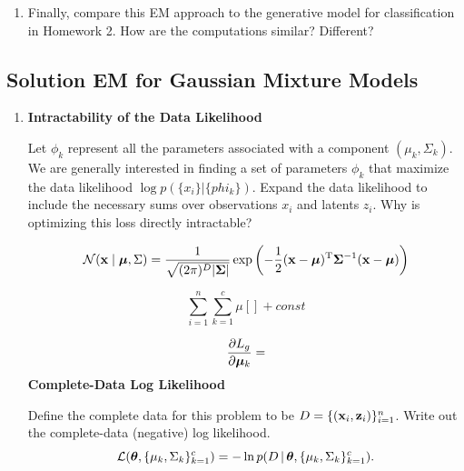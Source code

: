 \documentclass[submit]{harvardml}
\newenvironment{answer}{%
    \color{answergreen}\bf}
\newcommand{\bx}{\mathbf{x}} %
\begin{document}
\begin{problem}
\begin{enumerate}
\item Finally, compare this EM approach to the generative model for
classification in Homework 2.  How are the computations similar?
Different? 

\end{enumerate}


  
\end{problem}

\subsection*{Solution EM for Gaussian Mixture Models}


\begin{enumerate}

    \item \textbf{Intractability of the Data Likelihood} 
        
        Let $\phi_k$ represent all the parameters associated with a component $(\mu_k,\Sigma_k)$.
        We are generally interested in finding a set of parameters $\phi_k$ that maximize the data
        likelihood $\log p(\{x_i\}|\{phi_k\})$.  Expand the data likelihood to include the necessary
		sums over observations $x_i$ and latents $z_i$.  Why is optimizing this
		loss directly intractable?

		\begin{answer}

    \begin{equation}
     \mathcal{N}(\bx \mid \bmu, \Sigma)
             = \frac{1}{\sqrt{(2\pi)^D|\bSigma|}}  \exp\left(-\frac 1 2 ({\mathbf x}-{\boldsymbol\mu})^\mathrm{T}{\boldsymbol\Sigma}^{-1}({\mathbf x}-{\boldsymbol\mu})\right)
    \end{equation}

        \begin{equation}
            \sum_{i=1}^n \sum_{k=1}^c \mu
            \left[ 
            \right] + const
        \end{equation}

        \begin{equation}
        \frac{\partial L_g}{\partial \boldsymbol{\mu}_k} = 
        \end{equation}
		\end{answer}

    \item \textbf{Complete-Data Log Likelihood} 

        Define the complete data for this problem to be $D = \{(\mathbf{x}_i, \mathbf{z}_i)\}_{i=1}^n$.
        Write out the complete-data (negative) log likelihood.  \[\mathcal{L}(\boldsymbol{\theta},
        \{\mu_k,\Sigma_k\}^c_{k=1}) =  -\ln p(D \,|\,\boldsymbol{\theta}, \{\mu_k,\Sigma_k\}^c_{k=1}).\] 


\end{enumerate}
\end{document}
